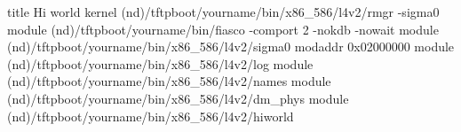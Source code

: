 title Hi world
  kernel (nd)/tftpboot/yourname/bin/x86_586/l4v2/rmgr -sigma0
  module (nd)/tftpboot/yourname/bin/fiasco -comport 2 -nokdb -nowait
  module (nd)/tftpboot/yourname/bin/x86_586/l4v2/sigma0
  modaddr 0x02000000
  module (nd)/tftpboot/yourname/bin/x86_586/l4v2/log
  module (nd)/tftpboot/yourname/bin/x86_586/l4v2/names
  module (nd)/tftpboot/yourname/bin/x86_586/l4v2/dm_phys
  module (nd)/tftpboot/yourname/bin/x86_586/l4v2/hiworld 
